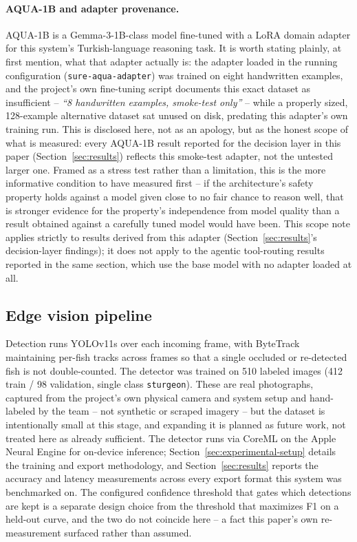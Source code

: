 \paragraph{AQUA-1B and adapter provenance.} AQUA-1B is a Gemma-3-1B-class model fine-tuned with a
LoRA domain adapter for this system's Turkish-language reasoning task. It is worth stating plainly,
at first mention, what that adapter actually is: the adapter loaded in the running configuration
(\texttt{sure-aqua-adapter}) was trained on eight handwritten examples, and the project's own
fine-tuning script documents this exact dataset as insufficient -- \emph{``8 handwritten examples,
smoke-test only''} -- while a properly sized, 128-example alternative dataset sat unused on disk,
predating this adapter's own training run. This is disclosed here, not as an apology, but as the honest scope of
what is measured: every AQUA-1B result reported for the decision layer in this paper
(Section~\ref{sec:results}) reflects this smoke-test adapter, not the untested larger one. Framed
as a stress test rather than a limitation, this is the more informative condition to have measured
first -- if the architecture's safety property holds against a model given close to no fair chance
to reason well, that is stronger evidence for the property's independence from model quality than
a result obtained against a carefully tuned model would have been. This scope note applies strictly
to results derived from this adapter (Section~\ref{sec:results}'s decision-layer findings); it does
not apply to the agentic tool-routing results reported in the same section, which use the base
model with no adapter loaded at all.

\subsection{Edge vision pipeline}
\label{sec:vision-pipeline}

Detection runs YOLOv11s over each incoming frame, with ByteTrack \citep{zhang2022bytetrack}
maintaining per-fish tracks across frames so that a single occluded or re-detected fish is not
double-counted. The detector was trained on 510 labeled images (412 train / 98 validation, single
class \texttt{sturgeon}). These are real photographs, captured from the project's own physical
camera and system setup and hand-labeled by the team -- not synthetic or scraped imagery -- but the
dataset is intentionally small at this stage, and expanding it is planned as future work, not
treated here as already sufficient. The detector runs via CoreML on the Apple Neural Engine for
on-device inference; Section~\ref{sec:experimental-setup} details the training and export methodology, and
Section~\ref{sec:results} reports the accuracy and latency measurements across every export format
this system was benchmarked on. The configured confidence threshold that gates which detections are
kept is a separate design choice from the threshold that maximizes F1 on a held-out curve, and the
two do not coincide here -- a fact this paper's own re-measurement surfaced rather than assumed.

